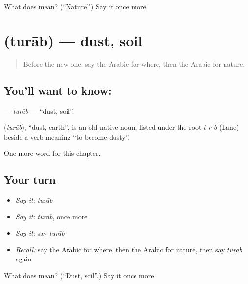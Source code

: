 \begin{tcolorbox}[breakable,colback=teal!4,colframe=teal!35!black,title={Before you move on}]
What does  mean? (\textquotedblleft{}Nature\textquotedblright{}.) Say it once more.
\end{tcolorbox}
\section[\texorpdfstring{\ar{تراب} (turāb)}{تراب (turāb)}]{ (turāb) — dust, soil}

\label{lesson:AR-C205-turab}



\begin{quote}
Before the new one: say the Arabic for where, then the Arabic for nature.
\end{quote}

\subsection*{You'll want to know: }
\textbf{} — \emph{turāb} — \textquotedblleft{}dust, soil\textquotedblright{}.

\begin{cousinweb}
\textbf{} (\emph{turāb}), \textquotedblleft{}dust, earth\textquotedblright{}, is an old native noun, listed under the root \emph{t-r-b} (Lane) beside a verb meaning \textquotedblleft{}to become dusty\textquotedblright{}.
\end{cousinweb}

\begin{grammarlens}[title={What you've built}]
One more word for this chapter.
\end{grammarlens}

\subsection*{Your turn}
\begin{itemize}
\raggedright
  \item \emph{Say it:} \emph{turāb}
  \item \emph{Say it:} \emph{turāb}, once more
  \item \emph{Say it:} say \emph{turāb}
  \item \emph{Recall:} say the Arabic for where, then the Arabic for nature, then say \emph{turāb} again
\end{itemize}

\begin{tcolorbox}[breakable,colback=teal!4,colframe=teal!35!black,title={Before you move on}]
What does  mean? (\textquotedblleft{}Dust, soil\textquotedblright{}.) Say it once more.
\end{tcolorbox}
